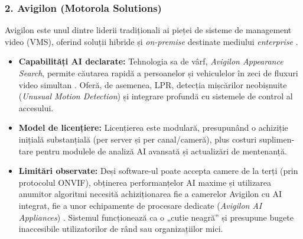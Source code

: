 \documentclass[../../main.tex]{subfiles}
\begin{document}
\subsubsection*{2. Avigilon (Motorola Solutions)}
Avigilon este unul dintre liderii tradiționali ai pieței de sisteme de management video (VMS), oferind soluții hibride și \emph{on-premise} destinate mediului \emph{enterprise} \cite{avigilon_appearance}.
\begin{itemize}
	\item \textbf{Capabilități AI declarate:} Tehnologia sa de vârf, \emph{Avigilon Appearance Search}, permite căutarea rapidă a persoanelor și vehiculelor în zeci de fluxuri video simultan \cite{avigilon_appearance}. Oferă, de asemenea, LPR, detecția mișcărilor neobișnuite (\emph{Unusual Motion Detection}) și integrare profundă cu sistemele de control al accesului.
	\item \textbf{Model de licențiere:} Licențierea este modulară, presupunând o achiziție inițială substanțială (per server și per canal/cameră), plus costuri suplimen-tare pentru modulele de analiză AI avansată și actualizări de mentenanță.
	\item \textbf{Limitări observate:} Deși software-ul poate accepta camere de la terți (prin protocolul ONVIF), obținerea performanțelor AI maxime și utilizarea anumitor algoritmi necesită achiziționarea fie a camerelor Avigilon cu AI integrat, fie a unor echipamente de procesare dedicate (\emph{Avigilon AI Appliances}) \cite{avigilon_appearance}. Sistemul funcționează ca o „cutie neagră” și presupune bugete inaccesibile utilizatorilor de rând sau organizațiilor mici.
\end{itemize}
\end{document}
